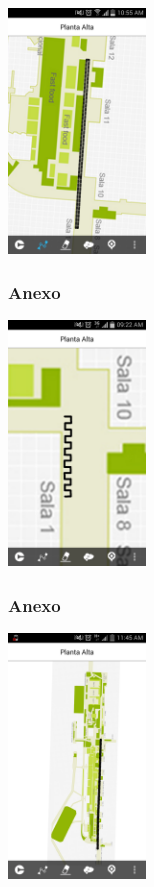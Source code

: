 \documentclass[12pt]{beamer}
\begin{document}
\begin{frame}	
	\begin{center}
		\includegraphics[height=6.5cm]{imagenes/redundante.png}
	\end{center}		
\end{frame}
	
\begin{frame}
	\frametitle{Anexo}
	\begin{center}
		\includegraphics[height=6.5cm]{imagenes/zigzag.png}	
	\end{center}
\end{frame}

\begin{frame}
	\frametitle{Anexo}
	\begin{center}
		\includegraphics[height=6.5cm]{imagenes/medioback.png}	
	\end{center}
\end{frame}
\end{document}
